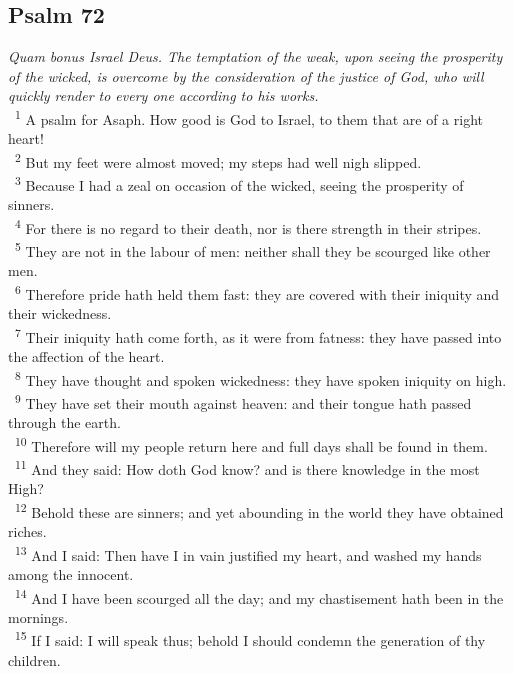 \documentclass[a5paper,12pt]{article}
\begin{document}
\begin{multicols*}{2}
\section{Psalm 72}
\label{sec:org7fec4af}
\emph{Quam bonus Israel Deus. The temptation of the weak, upon seeing the prosperity of the wicked, is overcome by the consideration of the justice of God, who will quickly render to every one according to his works.}\\

~\textsuperscript{1} A psalm for Asaph. How good is God to Israel, to them that are of a right heart!\\
~\textsuperscript{2} But my feet were almost moved; my steps had well nigh slipped.\\
~\textsuperscript{3} Because I had a zeal on occasion of the wicked, seeing the prosperity of sinners.\\
~\textsuperscript{4} For there is no regard to their death, nor is there strength in their stripes.\\
~\textsuperscript{5} They are not in the labour of men: neither shall they be scourged like other men.\\
~\textsuperscript{6} Therefore pride hath held them fast: they are covered with their iniquity and their wickedness.\\
~\textsuperscript{7} Their iniquity hath come forth, as it were from fatness: they have passed into the affection of the heart.\\
~\textsuperscript{8} They have thought and spoken wickedness: they have spoken iniquity on high.\\
~\textsuperscript{9} They have set their mouth against heaven: and their tongue hath passed through the earth.\\
~\textsuperscript{10} Therefore will my people return here and full days shall be found in them.\\
~\textsuperscript{11} And they said: How doth God know? and is there knowledge in the most High?\\
~\textsuperscript{12} Behold these are sinners; and yet abounding in the world they have obtained riches.\\
~\textsuperscript{13} And I said: Then have I in vain justified my heart, and washed my hands among the innocent.\\
~\textsuperscript{14} And I have been scourged all the day; and my chastisement hath been in the mornings.\\
~\textsuperscript{15} If I said: I will speak thus; behold I should condemn the generation of thy children.\\

\end{multicols*}
\end{document}
